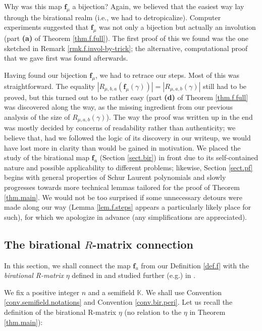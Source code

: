 \documentclass[numbers=enddot,12pt,final,onecolumn,notitlepage]{scrartcl}%
\theoremstyle{definition}
\begin{document}
Why was this map $\mathbf{f}_{\mu}$ a bijection? Again, we believed that the
easiest way lay through the birational realm (i.e., we had to detropicalize).
Computer experiments suggested that $\mathbf{f}_{\mu}$ was not only a
bijection but actually an involution (part \textbf{(a)} of Theorem
\ref{thm.f.full}). The first proof of this we found was the one sketched in
Remark \ref{rmk.f.invol-by-trick}; the alternative, computational proof that
we gave first was found afterwards.

Having found our bijection $\mathbf{f}_{\mu}$, we had to retrace our steps.
Most of this was straightforward. The equality $\left\vert R_{\mu,b,a}\left(
\mathbf{f}_{\mu}\left(  \gamma\right)  \right)  \right\vert =\left\vert
R_{\mu,a,b}\left(  \gamma\right)  \right\vert $ still had to be proved, but
this turned out to be rather easy (part \textbf{(d)} of Theorem
\ref{thm.f.full} was discovered along the way, as the missing ingredient from
our previous analysis of the size of $R_{\mu,a,b}\left(  \gamma\right)  $).
The way the proof was written up in the end was mostly decided by concerns of
readability rather than authenticity; we believe that, had we followed the
logic of its discovery in our writeup, we would have lost more in clarity than
would be gained in motivation. We placed the study of the birational map
$\mathbf{f}_{u}$ (Section \ref{sect.bir}) in front due to its self-contained
nature and possible applicability to different problems; likewise, Section
\ref{sect.pf} begins with general properties of Schur Laurent polynomials and
slowly progresses towards more technical lemmas tailored for the proof of
Theorem \ref{thm.main}. We would not be too surprised if some unnecessary
detours were made along our way (Lemma \ref{lem.f.steps} appears a
particularly likely place for such), for which we apologize in advance (any
simplifications are appreciated).

\subsection{\label{subsect.fin.Rmat}The birational $R$-matrix connection}

In this section, we shall connect the map $\mathbf{f}_{u}$ from our Definition
\ref{def.f} with the \textit{birational R-matrix }$\eta$ defined in
\cite[\S 6]{LamPyl12} and studied further (e.g.) in \cite{CheLin20}.

We fix a positive integer $n$ and a semifield $\mathbb{K}$. We shall use
Convention \ref{conv.semifield.notations} and Convention \ref{conv.bir.peri}.
Let us recall the definition of the birational R-matrix $\eta$ (no relation to
the $\eta$ in Theorem \ref{thm.main}):
\end{document}
